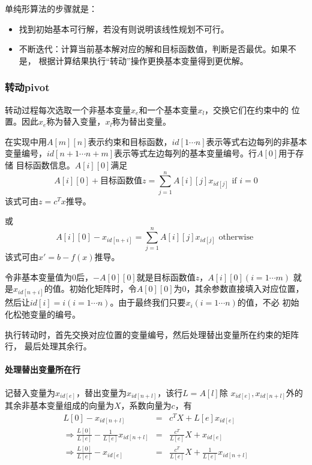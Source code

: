 单纯形算法的步骤就是：
\begin{itemize}
    \item 找到初始基本可行解，若没有则说明该线性规划不可行。
    \item 不断迭代：计算当前基本解对应的解和目标函数值，判断是否最优。如果不是，
    根据计算结果执行``转动''操作更换基本变量得到更优解。
\end{itemize}
\subsubsection{转动pivot}
转动过程每次选取一个非基本变量$x_e$和一个基本变量$x_l$，交换它们在约束中的
位置。因此$x_e$称为替入变量，$x_l$称为替出变量。

在实现中用$A[m][n]$表示约束和目标函数，$id[1\cdots n]$表示等式右边每列的非基本
变量编号，$id[n+1\cdots n+m]$表示等式左边每列的基本变量编号。行$A[0]$用于存储
目标函数信息。$A[i][0]$满足
\begin{displaymath}
    A[i][0]+\textrm{目标函数值}z=\sum_{j=1}^n{A[i][j]x_{id[j]}}\textrm{~if~}i=0
\end{displaymath}
该式可由$z=c^Tx$推导。

或
\begin{displaymath}
    A[i][0]-x_{id[n+i]}=\sum_{j=1}^n{A[i][j]x_{id[j]}}\textrm{~otherwise~}
\end{displaymath}
该式可由$x'=b-f(x)$推导。

令非基本变量值为0后，$-A[0][0]$就是目标函数值$z$，$A[i][0](i=1\cdots m)$
就是$x_{id[n+i]}$的值。初始化矩阵时，令$A[0][0]$为0，其余参数直接填入对应位置，
然后让$id[i]=i(i=1\cdots n)$。由于最终我们只要$x_i(i=1\cdots n)$的值，不必
初始化松弛变量的编号。

执行转动时，首先交换对应位置的变量编号，然后处理替出变量所在约束的矩阵行，
最后处理其余行。

\paragraph{处理替出变量所在行}
记替入变量为$x_{id[e]}$，替出变量为$x_{id[n+l]}$，该行$L=A[l]$除
$x_{id[e]},x_{id[n+l]}$外的其余非基本变量组成的向量为$X$，系数向量为$c$，有
\begin{eqnarray*}
    L[0]-x_{id[n+l]}&=&c^TX+L[e]x_{id[e]}\\
    \Rightarrow \frac{L[0]}{L[e]}-\frac{1}{L[e]}x_{id[n+l]}&=&
    \frac{c^T}{L[e]}X+x_{id[e]}\\
    \Rightarrow \frac{L[0]}{L[e]}-x_{id[e]}&=&
    \frac{c^T}{L[e]}X+\frac{1}{L[e]}x_{id[n+l]}
\end{eqnarray*}

